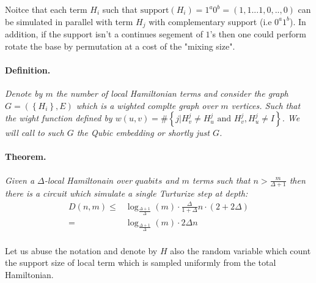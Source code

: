 \documentclass{article}
\begin{document}
Noitce that each term \(H_i\) such that \(\text{support}(H_{i}) = 1^{a}0^{b} = (1,1...1,0,..,0)\) can be simulated in parallel with term \(H_j\) with complementary support (i.e \(0^{a}1^{b}\)).  
In addition, if the support isn't a continues segement of \(1\)'s then one could perform rotate the base by permutation at a cost of the "mixing size".   

\paragraph{Definition.} \textit{ Denote by $m$ the number of local Hamiltonian terms and consider the graph \(G = \left( \left\{ H_{i} \right\}, E \right)\) which is a wighted complte graph over $m$ vertices. Such that the wight function defined by \(w(u,v) = \#\left\{ j | H_{v}^{j} \neq H_{u}^{j} \text{ and } H_{v}^{j},H_{u}^{j}\neq I \right\} \). We will call to such \(G\) the Qubic embedding or shortly just \(G\). }    

\paragraph{Theorem.} \textit{Given a $\Delta$-local Hamiltonain over $quabits$ and $m$ terms such that $n > \frac{m}{\Delta + 1}$ then there is a circuit which simulate a single Turturize step at depth:}
\begin{equation*}
  \begin{split}
    D\left(n,m\right) \leq & \log_{\frac{\Delta+1}{\Delta}}\left(m\right)\cdot \frac{\Delta}{1+\Delta}n \cdot \left( 2 + 2\Delta \right) \\ = & \log_{\frac{\Delta+1}{\Delta}}\left(m\right)\cdot2\Delta n 
  \end{split}
\end{equation*}

\paragraph{}
Let us abuse the notation and denote by $H$ also the random variable which count the support size of local term which is sampled uniformly from the total Hamiltonian. 
\end{document}
